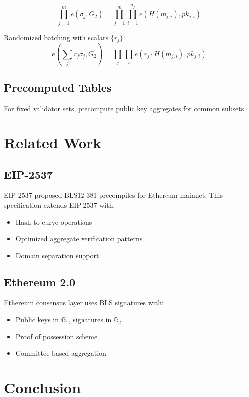 \documentclass[11pt,a4paper]{article}
\theoremstyle{definition}
\begin{document}
\begin{equation}
\prod_{j=1}^{m} e(\sigma_j, G_2) = \prod_{j=1}^{m} \prod_{i=1}^{n_j} e(H(m_{j,i}), pk_{j,i})
\end{equation}

Randomized batching with scalars $\{r_j\}$:
\begin{equation}
e\left(\sum_j r_j \sigma_j, G_2\right) = \prod_j \prod_i e(r_j \cdot H(m_{j,i}), pk_{j,i})
\end{equation}

\subsection{Precomputed Tables}

For fixed validator sets, precompute public key aggregates for common subsets.

\section{Related Work}

\subsection{EIP-2537}

EIP-2537 proposed BLS12-381 precompiles for Ethereum mainnet. This specification extends EIP-2537 with:
\begin{itemize}
    \item Hash-to-curve operations
    \item Optimized aggregate verification patterns
    \item Domain separation support
\end{itemize}

\subsection{Ethereum 2.0}

Ethereum consensus layer uses BLS signatures with:
\begin{itemize}
    \item Public keys in $\mathbb{G}_1$, signatures in $\mathbb{G}_2$
    \item Proof of possession scheme
    \item Committee-based aggregation
\end{itemize}

\section{Conclusion}
\end{document}
